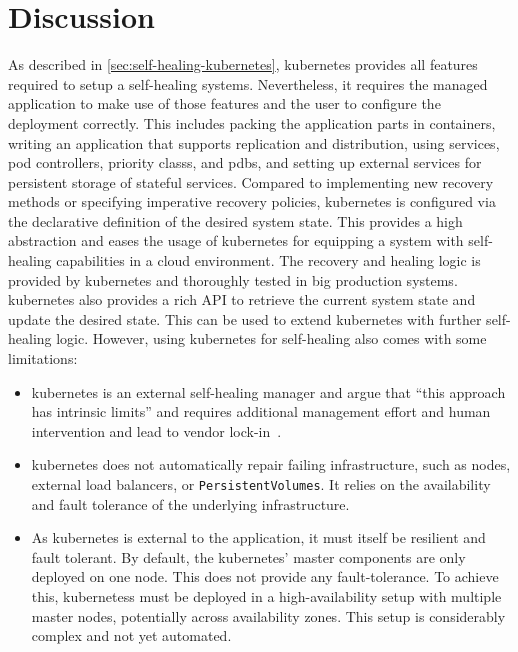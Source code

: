 
\section{Discussion}\label{sec:discussion}
  As described in \cref{sec:self-healing-kubernetes}, \gls{kubernetes} provides all features required to setup a self-healing systems.
  Nevertheless, it requires the managed application to make use of those features and the user to configure the deployment correctly.
  This includes packing the application parts in containers, writing an application that supports replication and distribution, using \glspl{service}, \glspl{pod controller}, \glspl{priority class}, and \glspl{pdb}, and setting up external services for persistent storage of stateful services.
  Compared to implementing new recovery methods or specifying imperative recovery policies, \gls{kubernetes} is configured via the declarative definition of the desired system state.
  This provides a high abstraction and eases the usage of \gls{kubernetes} for equipping a system with self-healing capabilities in a cloud environment.
  The recovery and healing logic is provided by \gls{kubernetes} and thoroughly tested in big production systems.
  \Gls{kubernetes} also provides a rich API to retrieve the current system state and update the desired state.
  This can be used to extend \gls{kubernetes} with further self-healing logic.
  However, using \gls{kubernetes} for self-healing also comes with some limitations:
  \begin{itemize}
    \item \Gls{kubernetes} is an external self-healing manager and \citeauthor{ToffettiMicroservices} argue that \enquote{this approach has intrinsic limits} and requires additional management effort and human intervention and lead to vendor lock-in~\cite{ToffettiMicroservices}.
    \item \Gls{kubernetes} does not automatically repair failing infrastructure, such as nodes, external load balancers, or \texttt{PersistentVolumes}.
      It relies on the availability and fault tolerance of the underlying infrastructure.
    \item As \gls{kubernetes} is external to the application, it must itself be resilient and fault tolerant.
      By default, the \gls{kubernetes}' master components are only deployed on one node.
      This does not provide any fault-tolerance.
      To achieve this, \glspl{kubernetes} must be deployed in a high-availability setup with multiple master nodes, potentially across availability zones.
      This setup is considerably complex and not yet automated.
  \end{itemize}
